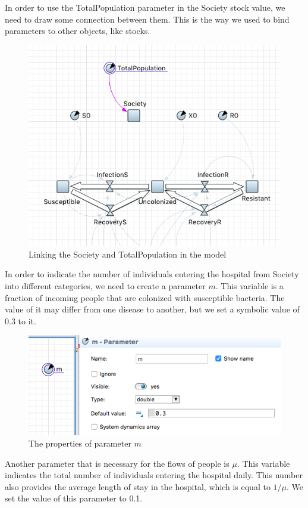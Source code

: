 In order to use the TotalPopulation parameter in the Society stock value, we need to draw some connection between them. This is the way we used to bind parameters to other objects, like stocks.

\begin{figure}[H]
  \centering
  \includegraphics[height=0.5\textwidth]{img/screens/society/society3}
  \caption{Linking the Society and TotalPopulation in the model}
\end{figure}

In order to indicate the number of individuals entering the hospital from Society into different categories, we need to create a parameter $m$. This variable is a fraction of incoming people that are colonized with susceptible bacteria. The value of it may differ from one disease to another, but we set a symbolic value of 0.3 to it.

\begin{figure}[H]
  \centering
  \includegraphics[height=0.3\textwidth]{img/screens/society/society4}
  \caption{The properties of parameter $m$}
\end{figure}

Another parameter that is necessary for the flows of people is $\mu$. This variable indicates the total number of individuals entering the hospital daily. This number also provides the average length of stay in the hospital, which is equal to $1/\mu$. We set the value of this parameter to 0.1.


